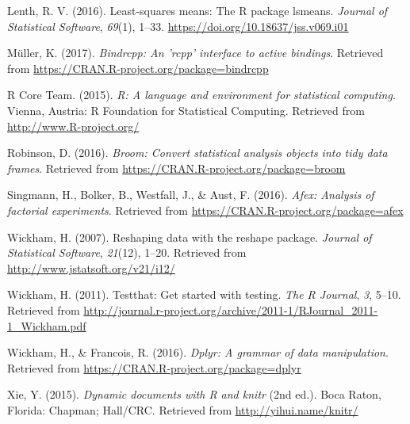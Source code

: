 \documentclass[english,man,floatsintext]{apa6}
\begin{document}
\leavevmode\hypertarget{ref-R-lsmeans}{}%
Lenth, R. V. (2016). Least-squares means: The R package lsmeans. \emph{Journal of Statistical Software}, \emph{69}(1), 1--33. \url{https://doi.org/10.18637/jss.v069.i01}

\leavevmode\hypertarget{ref-R-bindrcpp}{}%
Müller, K. (2017). \emph{Bindrcpp: An 'rcpp' interface to active bindings}. Retrieved from \url{https://CRAN.R-project.org/package=bindrcpp}

\leavevmode\hypertarget{ref-R-base}{}%
R Core Team. (2015). \emph{R: A language and environment for statistical computing}. Vienna, Austria: R Foundation for Statistical Computing. Retrieved from \url{http://www.R-project.org/}

\leavevmode\hypertarget{ref-R-broom}{}%
Robinson, D. (2016). \emph{Broom: Convert statistical analysis objects into tidy data frames}. Retrieved from \url{https://CRAN.R-project.org/package=broom}

\leavevmode\hypertarget{ref-R-afex}{}%
Singmann, H., Bolker, B., Westfall, J., \& Aust, F. (2016). \emph{Afex: Analysis of factorial experiments}. Retrieved from \url{https://CRAN.R-project.org/package=afex}

\leavevmode\hypertarget{ref-R-reshape2}{}%
Wickham, H. (2007). Reshaping data with the reshape package. \emph{Journal of Statistical Software}, \emph{21}(12), 1--20. Retrieved from \url{http://www.jstatsoft.org/v21/i12/}

\leavevmode\hypertarget{ref-R-testthat}{}%
Wickham, H. (2011). Testthat: Get started with testing. \emph{The R Journal}, \emph{3}, 5--10. Retrieved from \url{http://journal.r-project.org/archive/2011-1/RJournal_2011-1_Wickham.pdf}

\leavevmode\hypertarget{ref-R-dplyr}{}%
Wickham, H., \& Francois, R. (2016). \emph{Dplyr: A grammar of data manipulation}. Retrieved from \url{https://CRAN.R-project.org/package=dplyr}

\leavevmode\hypertarget{ref-R-knitr}{}%
Xie, Y. (2015). \emph{Dynamic documents with R and knitr} (2nd ed.). Boca Raton, Florida: Chapman; Hall/CRC. Retrieved from \url{http://yihui.name/knitr/}
\end{document}
